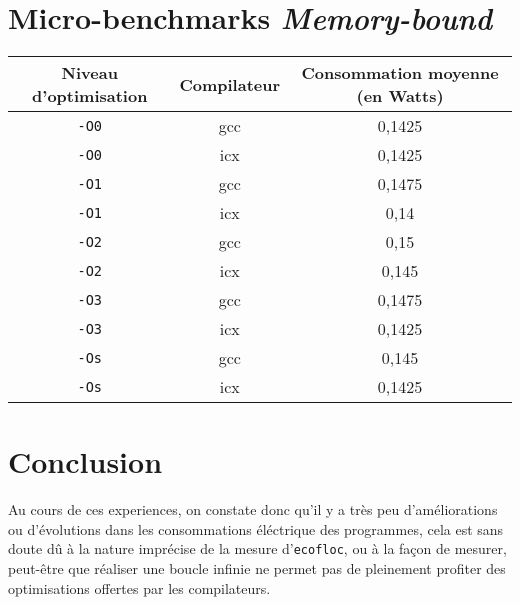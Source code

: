 \documentclass{rapport}
\begin{document}
    \section{Micro-benchmarks \textit{Memory-bound}}
    \begin{table}[H]
        \centering
        \begin{tabular}{c|c|c}
         Niveau d'optimisation & Compilateur & Consommation moyenne (en Watts) \\
         \hline
         \texttt{-O0} & gcc & 0,1425 \\
         \texttt{-O0} & icx & 0,1425 \\
         \hline
         \texttt{-O1} & gcc & 0,1475 \\
         \texttt{-O1} & icx & 0,14 \\
         \hline
         \texttt{-O2} & gcc & 0,15 \\
         \texttt{-O2} & icx & 0,145 \\
         \hline
         \texttt{-O3} & gcc & 0,1475 \\
         \texttt{-O3} & icx & 0,1425 \\
         \hline
         \texttt{-Os} & gcc & 0,145 \\
         \texttt{-Os} & icx & 0,1425 \\
        \end{tabular}
    \end{table}

    \section{Conclusion}
    Au cours de ces experiences, on constate donc qu'il y a très peu d'améliorations ou d'évolutions dans les consommations éléctrique des programmes, cela est sans doute dû à la nature imprécise de la mesure d'\texttt{ecofloc}, ou à la façon de mesurer, peut-être que réaliser une boucle infinie ne permet pas de pleinement profiter des optimisations offertes par les compilateurs.
    
    
\end{document}
